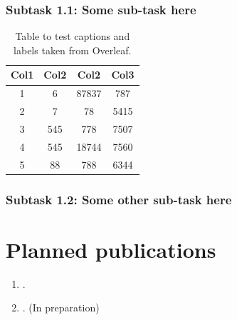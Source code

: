 \subsubsection*{Subtask 1.1: Some sub-task here}

\blindtext

\begin{table}[ht]
\centering
\begin{tabular}{c c c c} 
\toprule \toprule
Col1 & Col2 & Col2 & Col3 \\ 
\toprule \toprule
1 & 6 & 87837 & 787 \\ 
2 & 7 & 78 & 5415 \\
3 & 545 & 778 & 7507 \\
4 & 545 & 18744 & 7560 \\
5 & 88 & 788 & 6344 \\ 
\bottomrule
\end{tabular}
\caption{Table to test captions and labels taken from Overleaf.}
\label{table:1}
\end{table}


\subsubsection*{Subtask 1.2: Some other sub-task here}

\blindtext




\section{Planned publications}


\begin{enumerate} [leftmargin=0.6cm,itemsep=-6pt]
    \item {}. 
    \item {}.  \hfill (In preparation)
\end{enumerate}



